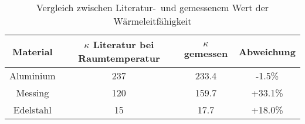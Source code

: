 \begin{table}[h!]
\begin{center}
\begin{tabular}{c|c|c|c}
	Material & $\kappa$ Literatur bei Raumtemperatur & $\kappa$ gemessen & Abweichung \\
\hline
	Aluminium & 237 & 233.4 & -1.5\% \\
	Messing & 120 & 159.7 & +33.1\% \\
	Edelstahl & 15 & 17.7 & +18.0\%\\
\end{tabular}
\end{center}
\caption[Vergleich zwischen Literatur- und gemessenem Wert der Wärmeleitfähigkeit]{Vergleich zwischen Literatur-\footnotemark\ und gemessenem Wert der Wärmeleitfähigkeit}
\end{table}
